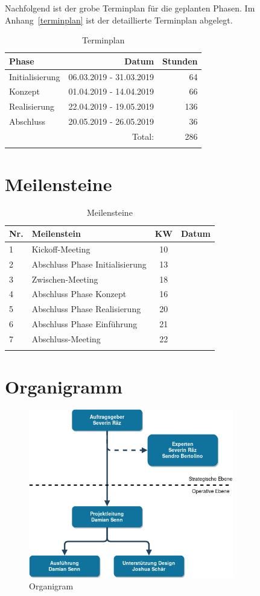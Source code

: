 Nachfolgend ist der grobe Terminplan für die geplanten Phasen. Im Anhang~\ref{terminplan} ist
der detaillierte Terminplan abgelegt.

\begin{longtable}[]{@{}lrr@{}}
  \toprule
  Phase           & Datum                   & Stunden\tabularnewline
  \midrule
  \endhead
  Initialisierung & 06.03.2019 - 31.03.2019 & 64\tabularnewline
  Konzept         & 01.04.2019 - 14.04.2019 & 66\tabularnewline
  Realisierung    & 22.04.2019 - 19.05.2019 & 136\tabularnewline
  Abschluss       & 20.05.2019 - 26.05.2019 & 36\tabularnewline
  \midrule
                  & Total:                  & 286\tabularnewline
  \bottomrule
  \caption{Terminplan}
\end{longtable}


\section{Meilensteine}\label{meilensteine}


\begin{longtable}[]{@{}llcl@{}}
  \toprule
  Nr. & Meilenstein                     & KW & Datum\tabularnewline
  \midrule
  \endhead
  1   & Kickoff-Meeting                 & 10 & \tabularnewline
  2   & Abschluss Phase Initialisierung & 13 & \tabularnewline
  3   & Zwischen-Meeting                & 18 & \tabularnewline
  4   & Abschluss Phase Konzept         & 16 & \tabularnewline
  5   & Abschluss Phase Realisierung    & 20 & \tabularnewline
  6   & Abschluss Phase Einführung      & 21 & \tabularnewline
  7   & Abschluss-Meeting               & 22 & \tabularnewline
  \bottomrule
  \caption{Meilensteine}
\end{longtable}

\clearpage

\section{Organigramm}\label{organigramm}

\begin{figure}[!htb]
  \centering
  \includegraphics[width=0.8\textwidth]{figures/organigram.png}
  \caption{Organigram}
\end{figure}

